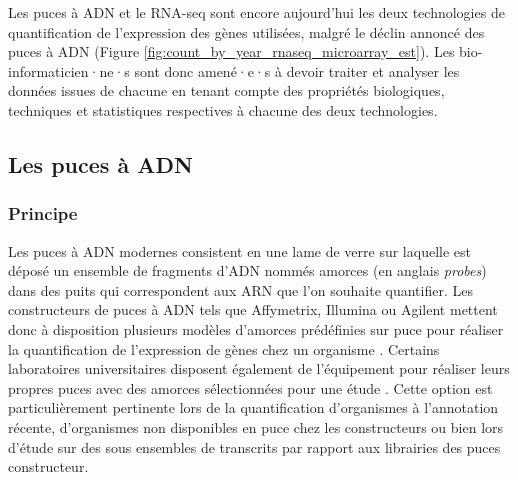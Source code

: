 Les puces à ADN et le RNA-seq sont encore aujourd'hui les deux technologies de quantification de l'expression des gènes utilisées, malgré le déclin annoncé des puces à ADN (Figure \ref{fig:count_by_year_rnaseq_microarray_est}). Les bio-informaticien·ne·s sont donc amené·e·s à devoir traiter et analyser les données issues de chacune en tenant compte des propriétés biologiques, techniques et statistiques respectives à chacune des deux technologies.




\subsection{Les puces à ADN}

\subsubsection{Principe}


Les puces à ADN modernes consistent en une lame de verre sur laquelle est déposé un ensemble de fragments d'ADN nommés amorces (en anglais \textit{probes}) dans des puits qui correspondent aux ARN que l'on souhaite quantifier. Les constructeurs de puces à ADN tels que Affymetrix, Illumina ou Agilent mettent donc à disposition plusieurs modèles d'amorces prédéfinies sur puce pour réaliser la quantification de l'expression de gènes chez un organisme \cite{Liu2010}. Certains laboratoires universitaires disposent également de l'équipement pour réaliser leurs propres puces avec des amorces sélectionnées pour une étude \cite{Thompson2001Apr}. Cette option est particulièrement pertinente lors de la quantification d'organismes à l'annotation récente, d'organismes non disponibles en puce chez les constructeurs ou bien lors d'étude sur des sous ensembles de transcrits par rapport aux librairies des puces constructeur.


